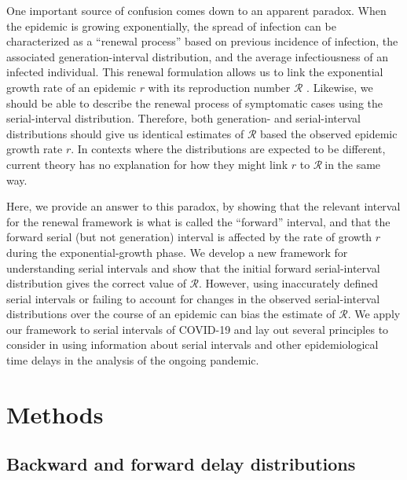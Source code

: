 \documentclass[12pt]{article}
\newcommand{\comment}{\showcomment}
\newcommand{\showcomment}[3]{\textcolor{#1}{\textbf{[#2: }\textsl{#3}\textbf{]}}}
\newcommand{\jd}[1]{\comment{cyan}{JD}{#1}}
\newcommand{\swp}[1]{\comment{magenta}{SWP}{#1}}
\newcommand{\Rx}[1]{\ensuremath{{\mathcal R}_{#1}}}
\begin{document}
One important source of confusion comes down to an apparent paradox.
When the epidemic is growing exponentially, the spread of infection can be characterized as a ``renewal process'' based on previous incidence of infection, the associated generation-interval distribution, and the average infectiousness of an infected individual.
This renewal formulation allows us to link the exponential growth rate of an epidemic $r$ with its reproduction number $\mathcal R$ \citep{wallinga2007generation}.
Likewise, we should be able to describe the renewal process of symptomatic cases using the serial-interval distribution.
Therefore, both generation- and serial-interval distributions should give us identical estimates of  $\mathcal R$ based the observed epidemic growth rate $r$.
In contexts where the distributions are expected to be different, current theory has no explanation for how they might link $r$ to \Rx\ in the same way.

Here, we provide an answer to this paradox, by showing that the relevant interval for the renewal framework is what is called the ``forward'' interval, and that the forward serial (but not generation) interval is affected by the rate of growth $r$ during the exponential-growth phase.
We develop a new framework for understanding serial intervals and show that the initial forward serial-interval distribution gives the correct value of $\mathcal R$.
However, using inaccurately defined serial intervals or failing to account for changes in the observed serial-interval distributions over the course of an epidemic can bias the estimate of $\mathcal R$.
We apply our framework to serial intervals of COVID-19 and lay out several principles to consider in using information about serial intervals and other epidemiological time delays in the analysis of the ongoing pandemic.

\section{Methods}

\subsection{Backward and forward delay distributions}
\end{document}
